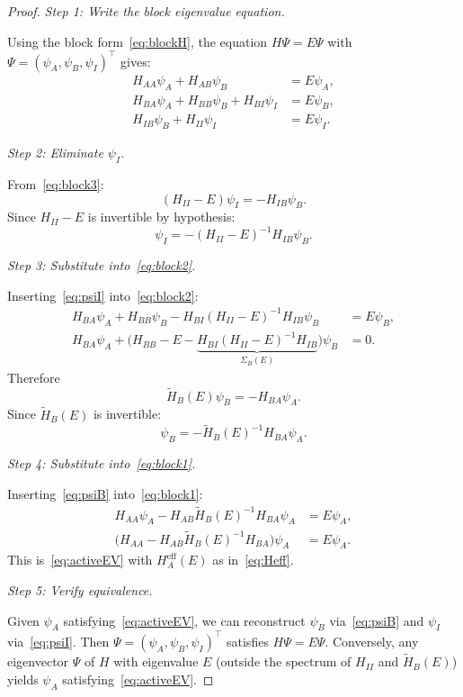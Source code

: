 \documentclass[12pt]{article}
\theoremstyle{plain}
\theoremstyle{definition}
\numberwithin{equation}{section}
\newcommand{\eff}{\mathrm{eff}}
\begin{document}
\begin{proof}
\emph{Step 1: Write the block eigenvalue equation.}

Using the block form~\eqref{eq:blockH}, the equation
$H\Psi=E\Psi$ with $\Psi=(\psi_A,\psi_B,\psi_I)^\top$ gives:
\begin{align}
H_{AA}\psi_A + H_{AB}\psi_B &= E\psi_A,\label{eq:block1}\\
H_{BA}\psi_A + H_{BB}\psi_B + H_{BI}\psi_I &= E\psi_B,\label{eq:block2}\\
H_{IB}\psi_B + H_{II}\psi_I &= E\psi_I.\label{eq:block3}
\end{align}

\emph{Step 2: Eliminate $\psi_I$.}

From~\eqref{eq:block3}:
\begin{equation}
(H_{II}-E)\psi_I = -H_{IB}\psi_B.
\end{equation}
Since $H_{II}-E$ is invertible by hypothesis:
\begin{equation}\label{eq:psiI}
\psi_I = -(H_{II}-E)^{-1}H_{IB}\psi_B.
\end{equation}

\emph{Step 3: Substitute into~\eqref{eq:block2}.}

Inserting~\eqref{eq:psiI} into~\eqref{eq:block2}:
\begin{align}
H_{BA}\psi_A + H_{BB}\psi_B
- H_{BI}(H_{II}-E)^{-1}H_{IB}\psi_B &= E\psi_B,\\
H_{BA}\psi_A
+ \bigl(H_{BB}-E-\underbrace{H_{BI}(H_{II}-E)^{-1}H_{IB}}_{\Sigma_B(E)}\bigr)\psi_B &= 0.
\end{align}
Therefore
\begin{equation}
\widetilde{H}_B(E)\psi_B = -H_{BA}\psi_A.
\end{equation}
Since $\widetilde{H}_B(E)$ is invertible:
\begin{equation}\label{eq:psiB}
\psi_B = -\widetilde{H}_B(E)^{-1}H_{BA}\psi_A.
\end{equation}

\emph{Step 4: Substitute into~\eqref{eq:block1}.}

Inserting~\eqref{eq:psiB} into~\eqref{eq:block1}:
\begin{align}
H_{AA}\psi_A - H_{AB}\widetilde{H}_B(E)^{-1}H_{BA}\psi_A
&= E\psi_A,\\
\bigl(H_{AA}-H_{AB}\widetilde{H}_B(E)^{-1}H_{BA}\bigr)\psi_A
&= E\psi_A.
\end{align}
This is~\eqref{eq:activeEV} with $H_A^{\eff}(E)$ as
in~\eqref{eq:Heff}.

\emph{Step 5: Verify equivalence.}

Given $\psi_A$ satisfying~\eqref{eq:activeEV}, we can reconstruct
$\psi_B$ via~\eqref{eq:psiB} and $\psi_I$ via~\eqref{eq:psiI}.
Then $\Psi=(\psi_A,\psi_B,\psi_I)^\top$ satisfies $H\Psi=E\Psi$.
Conversely, any eigenvector $\Psi$ of $H$ with eigenvalue $E$
(outside the spectrum of $H_{II}$ and $\widetilde{H}_B(E)$)
yields $\psi_A$ satisfying~\eqref{eq:activeEV}.
\end{proof}
\end{document}
